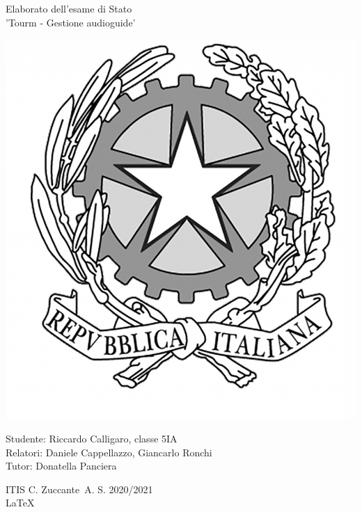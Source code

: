 \documentclass[12pt]{article}
\begin{document}
\begin{titlepage}
    \begin{center}
        \vspace*{1cm}

        \Huge
        Elaborato dell'esame di Stato \\\vspace{0.15cm} 'Tourm - Gestione audioguide'

        \vspace{1.5cm}

        \begin{center}
            \includegraphics[scale=0.08]{images/repubblica.png}
        \end{center}

        \normalsize
        Studente: Riccardo Calligaro, classe 5IA\\
        Relatori: Daniele Cappellazzo, Giancarlo Ronchi\\
        Tutor: Donatella Panciera

        \vfill

        ITIS C. Zuccante\
        A. S. 2020/2021\\\vspace{0.25cm}\LaTeX

    \end{center}
\end{titlepage}
\end{document}

